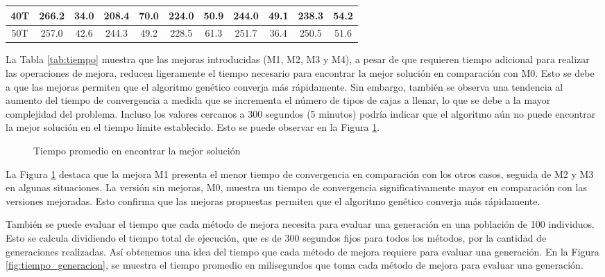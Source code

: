 \begin{table}[H]
\begin{tabular}{|c|c|c|c|c|c|c|c|c|c|c|}
        40T                                    & 266.2                            & 34.0                             & 208.4                            & 70.0                             & 224.0                            & 50.9        & 244.0          & 49.1        & 238.3          & 54.2        \\ \hline
        50T                                    & 257.0                            & 42.6                             & 244.3                            & 49.2                             & 228.5                            & 61.3        & 251.7          & 36.4        & 250.5          & 51.6        \\ \hline
    \end{tabular}
\end{table}

La Tabla \ref{tab:tiempo} muestra que las mejoras introducidas (M1, M2, M3 y M4), a pesar de que requieren tiempo adicional para realizar las operaciones de mejora, reducen ligeramente el tiempo necesario para encontrar la mejor solución en comparación con M0. Esto se debe a que las mejoras permiten que el algoritmo genético converja más rápidamente. Sin embargo, también se observa una tendencia al aumento del tiempo de convergencia a medida que se incrementa el número de tipos de cajas a llenar, lo que se debe a la mayor complejidad del problema. Incluso los valores cercanos a 300 segundos (5 minutos) podría indicar que el algoritmo aún no puede encontrar la mejor solución en el tiempo límite establecido. Esto se puede observar en la Figura \ref{fig:tiempos}.

\begin{figure}[H]
    \centering
    
    \caption{Tiempo promedio en encontrar la mejor solución}
    \label{fig:tiempos}
\end{figure}

La Figura \ref{fig:tiempos} destaca que la mejora M1 presenta el menor tiempo de convergencia en comparación con los otros casos, seguida de M2 y M3 en algunas situaciones. La versión sin mejoras, M0, muestra un tiempo de convergencia significativamente mayor en comparación con las versiones mejoradas. Esto confirma que las mejoras propuestas permiten que el algoritmo genético converja más rápidamente.

También se puede evaluar el tiempo que cada método de mejora necesita para evaluar una generación en una población de 100 individuos. Esto se calcula dividiendo el tiempo total de ejecución, que es de 300 segundos fijos para todos los métodos, por la cantidad de generaciones realizadas. Así obtenemos una idea del tiempo que cada método de mejora requiere para evaluar una generación. En la Figura \ref{fig:tiempo_generacion}, se muestra el tiempo promedio en milisegundos que toma cada método de mejora para evaluar una generación.

